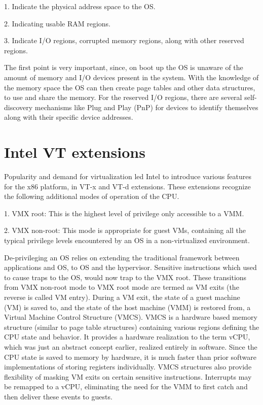 1. Indicate the physical address space to the OS.

2. Indicating usable RAM regions.

3. Indicate I/O regions, corrupted memory regions, along with other reserved regions.

The first point is very important, since, on boot up the OS is unaware of the amount of memory and I/O devices present in the system. With the knowledge of the memory space the OS can then create page tables and other data structures, to use and share the memory. For the reserved I/O regions, there are several self-discovery mechanisms like Plug and Play (PnP) for devices to identify themselves along with their specific device addresses. 


\section{Intel VT extensions}


Popularity and demand for virtualization led Intel to introduce various features for the x86 platform, in VT-x \cite{intel_manual} and VT-d \cite{intelvtd} extensions. These extensions recognize the following additional modes of operation of the CPU.

1. VMX root: This is the highest level of privilege only accessible to a VMM.

2. VMX non-root: This mode is appropriate for guest VMs, containing all the typical privilege levels encountered by an OS in a non-virtualized environment.

De-privileging an OS relies on extending the traditional framework between applications and OS, to OS and the hypervisor. Sensitive instructions which used to cause traps to the OS, would now trap to the VMX root. These transitions from VMX non-root mode to VMX root mode are termed as VM exits (the reverse is called VM entry). During a VM exit, the state of a guest machine (VM) is saved to, and the state of the host machine (VMM) is restored from, a Virtual Machine Control Structure (VMCS). VMCS is a hardware based memory structure (similar to page table structures) containing various regions defining the CPU state and behavior. It provides a hardware realization to the term vCPU, which was just an abstract concept earlier, realized entirely in software. Since the CPU state is saved to memory by hardware, it is much faster than prior software implementations of storing registers individually. VMCS structures also provide flexibility of masking VM exits on certain sensitive instructions. Interrupts may be remapped to a vCPU, eliminating the need for the VMM to first catch and then deliver these events to guests.

